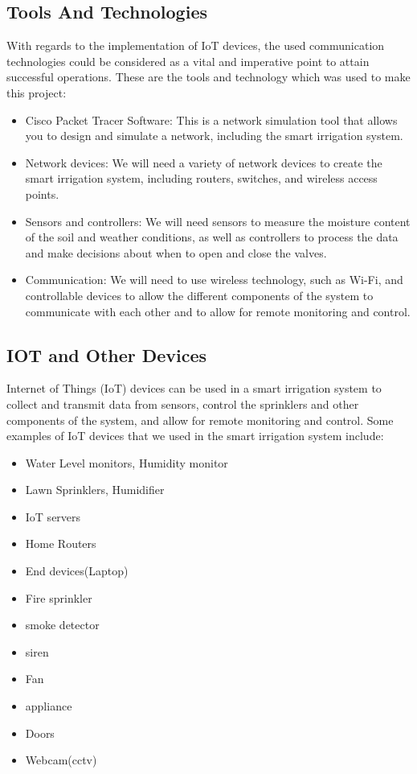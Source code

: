\documentclass{report}
\begin{document}
\subsection{Tools And Technologies}
With regards to the implementation of IoT devices, the used communication technologies could be considered as a vital and imperative point to attain successful operations. These are the tools and technology which was used to make this project: \cite{jakaria}
\begin{itemize}
    \item Cisco Packet Tracer Software: This is a network simulation tool that allows you to design and simulate a network, including the smart irrigation system.
    \item Network devices: We will need a variety of network devices to create the smart irrigation system, including routers, switches, and wireless access points.
    \item Sensors and controllers: We will need sensors to measure the moisture content of the soil and weather conditions, as well as controllers to process the data and make decisions about when to open and close the valves.
    \item Communication: We will need to use wireless technology, such as Wi-Fi, and controllable devices to allow the different components of the system to communicate with each other and to allow for remote monitoring and control.
\end{itemize}
\subsection{IOT and Other Devices}
Internet of Things (IoT) devices can be used in a smart irrigation system to collect and transmit data from sensors, control the sprinklers and other components of the system, and allow for remote monitoring and control. Some examples of IoT devices that we used in the smart irrigation system include:
\begin{itemize}
    \item Water Level monitors, Humidity monitor
    \item Lawn Sprinklers, Humidifier
    \item IoT servers
    \item Home Routers
    \item End devices(Laptop)
    \item Fire sprinkler
    \item smoke detector
    \item siren
    \item Fan
    \item appliance
    \item Doors
    \item Webcam(cctv)
\end{itemize}
\end{document}
